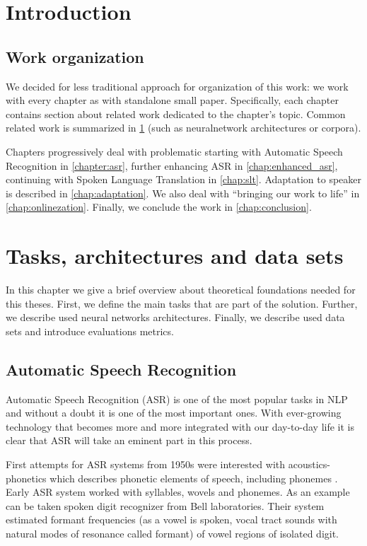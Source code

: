 
\chapter*{Introduction}

\section*{Work organization}
We decided for less traditional approach for organization of this work: we work with every chapter as with standalone small paper. Specifically, each  chapter contains section about related work dedicated to the chapter's topic. Common related work is summarized in \cref{chap:theory} (such as neuralnetwork   architectures or corpora).

Chapters progressively deal with problematic starting with Automatic Speech Recognition in \cref{chapter:asr}, further enhancing ASR in \cref{chap:enhanced_asr}, continuing with Spoken Language Translation in \cref{chap:slt}. Adaptation to speaker is described in \cref{chap:adaptation}. We also deal with ``bringing our work to life'' in \cref{chap:onlinezation}. Finally, we conclude the work in \cref{chap:conclusion}.


\chapter{Tasks, architectures and data sets}
\label{chap:theory}
In this chapter we give a brief overview about theoretical foundations needed for this theses. First, we define the main tasks that are part of the solution. Further, we describe used neural networks architectures. Finally, we describe used data sets and introduce evaluations metrics.

\section{Automatic Speech Recognition}
Automatic Speech Recognition (ASR) is one of the most popular tasks in NLP and without a doubt it is one of the most important ones. With ever-growing technology that becomes more and more integrated with our day-to-day life it is clear that ASR will take an eminent part in this process.

First attempts for ASR systems from 1950s were interested with acoustics-phonetics which describes phonetic elements of speech, including phonemes . Early ASR system worked with syllables, wovels and phonemes. As an example can be taken spoken digit recognizer from Bell laboratories. Their system estimated formant frequencies (as a vowel is spoken, vocal tract sounds with natural modes of resonance called formant) of vowel regions of isolated digit. 

